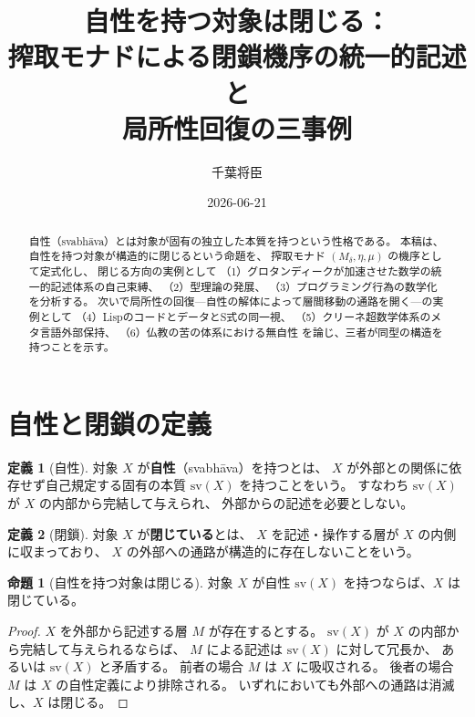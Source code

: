 \documentclass[11pt,a4paper]{article}
\title{自性を持つ対象は閉じる：\\
搾取モナドによる閉鎖機序の統一的記述と\\
局所性回復の三事例}
\author{千葉将臣}
\date{2026-06-21}
\theoremstyle{definition}
\newtheorem{definition}{定義}[section]
\newtheorem{proposition}{命題}[section]
\newcommand{\svabhava}{\mathrm{sv}}
\begin{document}
\maketitle

\begin{abstract}
自性（svabhāva）とは対象が固有の独立した本質を持つという性格である。
本稿は、自性を持つ対象が構造的に閉じるという命題を、
搾取モナド $(M_\delta, \eta, \mu)$ の機序として定式化し、
閉じる方向の実例として
（1）グロタンディークが加速させた数学の統一的記述体系の自己束縛、
（2）型理論の発展、
（3）プログラミング行為の数学化
を分析する。
次いで局所性の回復---自性の解体によって層間移動の通路を開く---の実例として
（4）LispのコードとデータとS式の同一視、
（5）クリーネ超数学体系のメタ言語外部保持、
（6）仏教の苦の体系における無自性
を論じ、三者が同型の構造を持つことを示す。
\end{abstract}

\section{自性と閉鎖の定義}

\begin{definition}[自性]
対象 $X$ が\textbf{自性}（svabhāva）を持つとは、
$X$ が外部との関係に依存せず自己規定する固有の本質 $\svabhava(X)$ を持つことをいう。
すなわち $\svabhava(X)$ が $X$ の内部から完結して与えられ、
外部からの記述を必要としない。
\end{definition}

\begin{definition}[閉鎖]
対象 $X$ が\textbf{閉じている}とは、
$X$ を記述・操作する層が $X$ の内側に収まっており、
$X$ の外部への通路が構造的に存在しないことをいう。
\end{definition}

\begin{proposition}[自性を持つ対象は閉じる]
対象 $X$ が自性 $\svabhava(X)$ を持つならば、$X$ は閉じている。
\end{proposition}

\begin{proof}
$X$ を外部から記述する層 $M$ が存在するとする。
$\svabhava(X)$ が $X$ の内部から完結して与えられるならば、
$M$ による記述は $\svabhava(X)$ に対して冗長か、
あるいは $\svabhava(X)$ と矛盾する。
前者の場合 $M$ は $X$ に吸収される。
後者の場合 $M$ は $X$ の自性定義により排除される。
いずれにおいても外部への通路は消滅し、$X$ は閉じる。
\end{proof}
\end{document}
